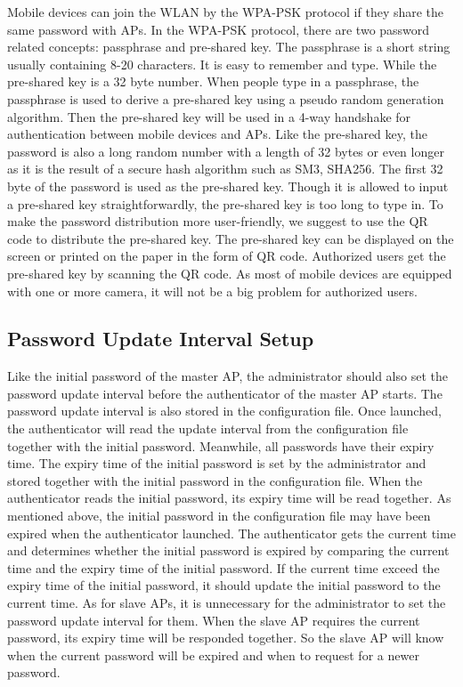 Mobile devices can join the WLAN by the WPA-PSK protocol if they share the same password with APs. In the WPA-PSK protocol, there are two password related concepts: passphrase and pre-shared key. The passphrase is a short string usually containing 8-20 characters. It is easy to remember and type. While the pre-shared key is a 32 byte number. When people type in a passphrase, the passphrase is used to derive a pre-shared key using a pseudo random generation algorithm. Then the pre-shared key will be used in a 4-way handshake for authentication between mobile devices and APs. Like the pre-shared key, the password is also a long random number with a length of 32 bytes or even longer as it is the result of a secure hash algorithm such as SM3, SHA256. The first 32 byte of the password is used as the pre-shared key. Though it is allowed to input a pre-shared key straightforwardly, the pre-shared key is too long to type in. To make the password distribution more user-friendly, we suggest to use the QR code to distribute the pre-shared key. The pre-shared key can be displayed on the screen or printed on the paper in the form of QR code. Authorized users get the pre-shared key by scanning the QR code. As most of mobile devices are equipped with one or more camera, it will not be a big problem for authorized users. 

\subsection{Password Update Interval Setup}
Like the initial password of the master AP, the administrator should also set the password update interval before the authenticator of the master AP starts. The password update interval is also stored in the configuration file. Once launched, the authenticator will read the update interval from the configuration file together with the initial password. Meanwhile, all passwords have their expiry time. The expiry time of the initial password is set by the administrator and stored together with the initial password in the configuration file. When the authenticator reads the initial password, its expiry time will be read together. As mentioned above, the initial password in the configuration file may have been expired when the authenticator launched. The authenticator gets the current time and determines whether the initial password is expired by comparing the current time and the expiry time of the initial password. If the current time exceed the expiry time of the initial password, it should update the initial password to the current time. As for slave APs, it is unnecessary for the administrator to set the password update interval for them. When the slave AP requires the current password, its expiry time will be responded together. So the slave AP will know when the current password will be expired and when to request for a newer password. 


